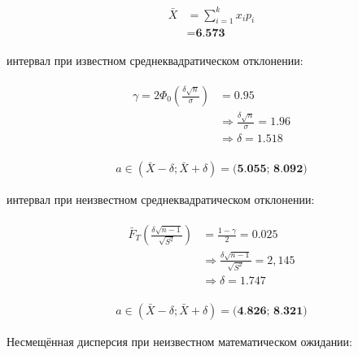 \documentclass[12pt, a4paper]{article}
\begin{document}
\begin{multicols}{2}
  \null \vfill
  \begin{align*}
    \begin{split}
      \bar{X} &= \sum_{i=1}^{k}x_ip_i \\
              &= \textbf{6.573}
    \end{split}
  \end{align*}
  \vfill \null

  \columnbreak

   интервал при известном среднеквадратическом отклонении:
  
  \begin{align*}
    \begin{split}
      \gamma = 2\Phi_0 \left( \frac{\delta\sqrt{n}}{\sigma} \right) &= 0.95 \\
        &\Rightarrow \frac{\delta\sqrt{n}}{\sigma} = 1.96 \\
        &\Rightarrow \delta = 1.518
    \end{split}
  \end{align*}

  \begin{align*}
    a \in (\bar{X} - \delta; \bar{X} + \delta) = \textbf{(5.055; 8.092)}
  \end{align*}

   интервал при неизвестном среднеквадратическом отклонении:

  \begin{align*}
    \begin{split}
      \bar{F}_T \left( \frac{\delta\sqrt{n - 1}}{\sqrt{S^2}} \right) &= \frac{1 - \gamma}{2} = 0.025 \\
        &\Rightarrow \frac{\delta\sqrt{n - 1}}{\sqrt{S^2}} = 2,145 \\
        &\Rightarrow \delta = 1.747
    \end{split}
  \end{align*}

  \begin{align*}
    a \in (\bar{X} - \delta; \bar{X} + \delta) = \textbf{(4.826; 8.321)}
  \end{align*}
\end{multicols}

\newpage
\noindent Несмещённая дисперсия при неизвестном математическом ожидании:
\end{document}
